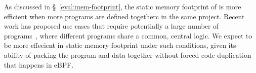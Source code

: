 
As discussed in \S~\ref{eval:mem-footprint}, the static memory footprint of
    \projname{} is more efficient when more programs are defined togetherc in
    the same project.
Recent work has proposed use cases that require potentially a large number of
    programs~\cite{ebpf-kcfi}, where different programs share a common, central
    logic.
We expect \projname{} to be more effecient in static memory footprint under
    such conditions, given its ability of packing the program and data together
    without forced code duplication that happens in eBPF.